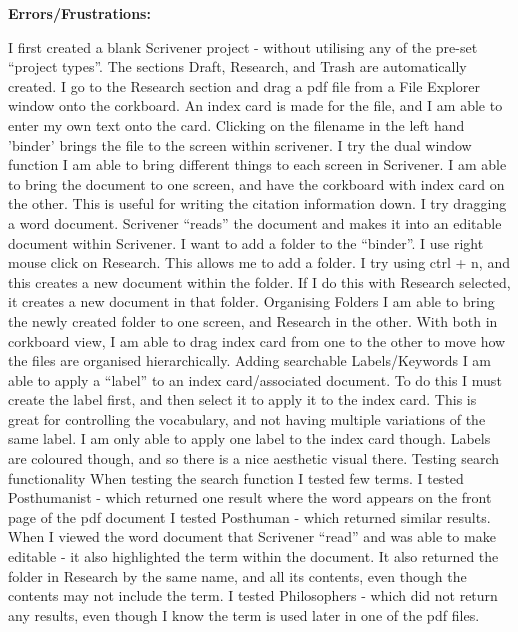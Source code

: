 \documentclass{article}
\begin{document}
\label{Error: Scrivener Errors/Frustrations}
\textbf{Errors/Frustrations:}

\begin{outline}
\1 I first created a blank Scrivener project - without utilising any of the pre-set ``project types''. 
    \2 The sections Draft, Research, and Trash are automatically created. 
\1 I go to the Research section and drag a pdf file from a File Explorer window onto the corkboard.
    \2 An index card is made for the file, and I am able to enter my own text onto the card. Clicking on the filename in the left hand 'binder' brings the file to the screen within scrivener. 
\1 I try the dual window function
    \2 I am able to bring different things to each screen in Scrivener. I am able to bring the document to one screen, and have the corkboard with index card on the other. This is useful for writing the citation information down. 
\1 I try dragging a word document.
    \2 Scrivener ``reads'' the document and makes it into an editable document within Scrivener. 
\1 I want to add a folder to the ``binder''.
    \2 I use right mouse click on Research. This allows me to add a folder. I try using ctrl + n, and this creates a new document within the folder. If I do this with Research selected, it creates a new document in that folder. 
\1 Organising Folders
    \2 I am able to bring the newly created folder to one screen, and Research in the other. With both in corkboard view, I am able to drag index card from one to the other to move how the files are organised hierarchically.
\1 Adding searchable Labels/Keywords
    \2 I am able to apply a ``label'' to an index card/associated document. To do this I must create the label first, and then select it to apply it to the index card. This is great for controlling the vocabulary, and not having multiple variations of the same label. I am only able to apply one label to the index card though. Labels are coloured though, and so there is a nice aesthetic visual there. 
\1 Testing search functionality
    \2 When testing the search function I tested few terms. 
    \2 I tested Posthumanist - which returned one result where the word appears on the front page of the pdf document
    \2 I tested Posthuman - which returned similar results. When I viewed the word document that Scrivener ``read'' and was able to make editable - it also highlighted the term within the document. It also returned the folder in Research by the same name, and all its contents, even though the contents may not include the term.
    \2 I tested Philosophers - which did not return any results, even though I know the term is used later in one of the pdf files.
\end{outline}
\end{document}
